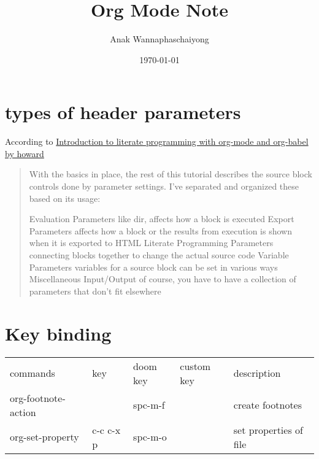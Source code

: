 \documentclass[11pt]{article}
\author{Anak Wannaphaschaiyong}
\date{\today}
\title{Org Mode Note}
\begin{document}
\maketitle
\tableofcontents


\section{types of header parameters}
\label{sec:orgff005fd}
According to \href{file:///home/awannaphasch2016/org/notes/emacs/packages/org-babel.org}{Introduction to literate programming with org-mode and org-babel by howard}

\begin{quote}
With the basics in place, the rest of this tutorial describes the source block controls done by parameter settings. I’ve separated and organized these based on its usage:

Evaluation Parameters
like dir, affects how a block is executed
Export Parameters
affects how a block or the results from execution is shown when it is exported to HTML
Literate Programming Parameters
connecting blocks together to change the actual source code
Variable Parameters
variables for a source block can be set in various ways
Miscellaneous Input/Output
of course, you have to have a collection of parameters that don’t fit elsewhere
\end{quote}

\section{Key binding}
\label{sec:orgd5282eb}
\begin{center}
\begin{tabular}{lllll}
commands & key & doom key & custom key & description\\
org-footnote-action &  & spc-m-f &  & create footnotes\\
org-set-property & c-c c-x p & spc-m-o &  & set properties of file\\
\end{tabular}
\end{center}
\end{document}
